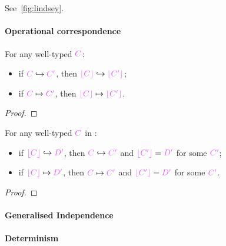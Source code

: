 \documentclass[main.tex]{subfiles}
\begin{document}
\section{\lambdalvar}



See~\cref{fig:lindsey}.

\paragraph{Operational correspondence}
\begin{theorem}[Simulation]
  For any well-typed $\tm{C}$:
  \begin{itemize}
  \item 
    if $\tm{C}\red\tm{C'}$, then $\tm{\trans{C}}\red\tm{\trans{C'}}$;
  \item
    if $\tm{C}\rede\tm{C'}$, then $\tm{\trans{C}}\rede\tm{\trans{C'}}$.
  \end{itemize}
\end{theorem}
\begin{proof}
\end{proof}

\begin{theorem}[Reflection]
  For any well-typed $\tm{C}$ in \typedlambdalvar:
  \begin{itemize}
  \item
    if $\tm{\trans{C}}\red\tm{D'}$,
    then $\tm{C}\red\tm{C'}$ and $\tm{\trans{C'}}=\tm{D'}$ for some $\tm{C'}$;
  \item
    if $\tm{\trans{C}}\rede\tm{D'}$,
    then $\tm{C}\rede\tm{C'}$ and $\tm{\trans{C'}}=\tm{D'}$ for some $\tm{C'}$.
  \end{itemize}
\end{theorem}
\begin{proof}
\end{proof}

\paragraph{Generalised Independence}
\begin{theorem}
\end{theorem}
\begin{corollary}
\end{corollary}

\paragraph{Determinism}
\begin{lemma}
\end{lemma}
\begin{lemma}
\end{lemma}
\begin{theorem}
\end{theorem}
\begin{corollary}
\end{corollary}
\end{document}
